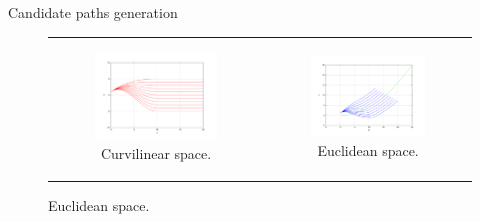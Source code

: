\begin{frame}{Candidate paths generation}
  \begin{figure}
  \centering
  \begin{tabular}{cc}
    \begin{subfigure}[b]{0.3\textwidth}
      \centering
      \includegraphics[height=0.3\textheight, trim=50 40 80 60,clip]{frenet45}
      \caption{Curvilinear space.}
    \end{subfigure} &
    \begin{subfigure}[b]{0.3\textwidth}
      \centering
      \includegraphics[height=0.3\textheight, trim=50 40 80 60,clip]{cartesian45}
      \caption{Euclidean space.}
      \end{subfigure}
  \end{tabular}
  \end{figure}
  \note {
    
  }
\end{frame}

